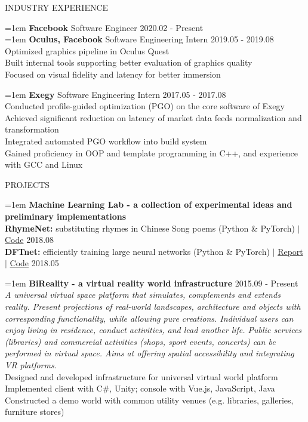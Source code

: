 \documentclass[10pt]{article}
\begin{document}
\vspace{1em}
{\LARGE INDUSTRY EXPERIENCE}

\hangindent=1em
\textbf{Facebook} \hfill Software Engineer \hfill 2020.02 - Present \\

\hangindent=1em
\textbf{Oculus, Facebook} \hfill Software Engineering Intern \hfill 2019.05 - 2019.08 \\
Optimized graphics pipeline in Oculus Quest \\
Built internal tools supporting better evaluation of graphics quality \\
Focused on visual fidelity and latency for better immersion

\hangindent=1em
\textbf{Exegy} \hfill Software Engineering Intern \hfill 2017.05 - 2017.08 \\
Conducted profile-guided optimization (PGO) on the core software of Exegy \\
Achieved significant reduction on latency of market data feeds normalization and transformation \\
Integrated automated PGO workflow into build system \\
Gained proficiency in OOP and template programming in C++, and experience with GCC and Linux

\vspace{1em}
{\LARGE PROJECTS}

\hangindent=1em
\textbf{Machine Learning Lab - a collection of experimental ideas and preliminary implementations} \\
\textbf{RhymeNet:} substituting rhymes in Chinese Song poems (Python \& PyTorch) $|$ \href{https://github.com/liujch1998/Lab/tree/master/ml-songci}{Code} \hfill 2018.08 \\
\textbf{DFTnet:} efficiently training large neural networks (Python \& PyTorch) $|$ \href{https://github.com/liujch1998/Lab/blob/master/ml-dft-nn/report/report.pdf}{Report} $|$ \href{https://github.com/liujch1998/Lab/tree/master/ml-dft-nn}{Code} \hfill 2018.05

\hangindent=1em
\textbf{BiReality - a virtual reality world infrastructure} \hfill 2015.09 - Present \\
\textit{A universal virtual space platform that simulates, complements and extends reality. Present projections of real-world landscapes, architecture and objects with corresponding functionality, while allowing pure creations. Individual users can enjoy living in residence, conduct activities, and lead another life. Public services (libraries) and commercial activities (shops, sport events, concerts) can be performed in virtual space. Aims at offering spatial accessibility and integrating VR platforms.} \\
Designed and developed infrastructure for universal virtual world platform \\
Implemented client with C\#, Unity; console with Vue.js, JavaScript, Java \\
Constructed a demo world with common utility venues (e.g. libraries, galleries, furniture stores)
\end{document}
